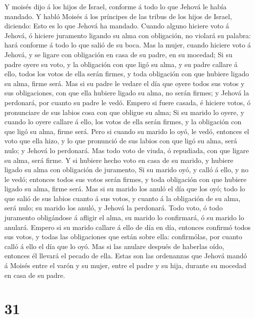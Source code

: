  Y moisés dijo á los hijos de Israel, conforme á todo lo que
Jehová le había mandado.  Y habló Moisés á los príncipes de
las tribus de los hijos de Israel, diciendo: Esto es lo que Jehová ha
mandado.  Cuando alguno hiciere voto á Jehová, ó hiciere
juramento ligando su alma con obligación, no violará su palabra: hará
conforme á todo lo que salió de su boca.  Mas la mujer,
cuando hiciere voto á Jehová, y se ligare con obligación en casa de su
padre, en su mocedad;  Si su padre oyere su voto, y la
obligación con que ligó su alma, y su padre callare á ello, todos los
votos de ella serán firmes, y toda obligación con que hubiere ligado su
alma, firme será.  Mas si su padre le vedare el día que
oyere todos sus votos y sus obligaciones, con que ella hubiere ligado su
alma, no serán firmes; y Jehová la perdonará, por cuanto su padre le
vedó.  Empero si fuere casada, é hiciere votos, ó
pronunciare de sus labios cosa con que obligue su alma;  Si
su marido lo oyere, y cuando lo oyere callare á ello, los votos de ella
serán firmes, y la obligación con que ligó su alma, firme será.
 Pero si cuando su marido lo oyó, le vedó, entonces el voto
que ella hizo, y lo que pronunció de sus labios con que ligó su alma,
será nulo; y Jehová lo perdonará.  Mas todo voto de viuda,
ó repudiada, con que ligare su alma, será firme.  Y si
hubiere hecho voto en casa de su marido, y hubiere ligado su alma con
obligación de juramento,  Si su marido oyó, y calló á ello,
y no le vedó; entonces todos sus votos serán firmes, y toda obligación
con que hubiere ligado su alma, firme será.  Mas si su
marido los anuló el día que los oyó; todo lo que salió de sus labios
cuanto á sus votos, y cuanto á la obligación de su alma, será nulo; su
marido los anuló, y Jehová la perdonará.  Todo voto, ó todo
juramento obligándose á afligir el alma, su marido lo confirmará, ó su
marido lo anulará.  Empero si su marido callare á ello de
día en día, entonces confirmó todos sus votos, y todas las obligaciones
que están sobre ella: confirmólas, por cuanto calló á ello el día que lo
oyó.  Mas si las anulare después de haberlas oído, entonces
él llevará el pecado de ella. Estas son las ordenanzas que Jehová mandó
á Moisés entre el varón y su mujer, entre el padre y su hija, durante su
mocedad en casa de su padre.

\hypertarget{section-30}{%
\section{31}\label{section-30}}


